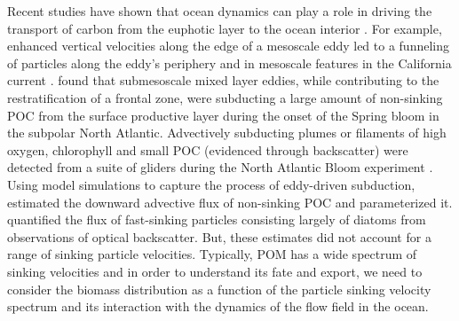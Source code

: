 \documentclass[article,linenumbers]{agujournal2019}
\begin{document}
	Recent studies have shown that ocean dynamics can play a role in driving the transport of carbon from the euphotic layer to the ocean interior \cite{Stukel_2017b,Stukel_2018,Llort_2018}.  For example, enhanced vertical velocities along the edge of a mesoscale eddy led to a funneling of particles along the eddy's periphery \cite{vanHaren_2006, Waite_2016} and in mesoscale features in the California current \cite{Stukel_2017}.  found that submesoscale mixed layer eddies, while contributing to the restratification of a frontal zone, were subducting a large amount of non-sinking POC from the surface productive layer during the onset of the Spring bloom in the subpolar North Atlantic. Advectively subducting plumes or filaments of high oxygen, chlorophyll and small POC (evidenced through backscatter) were detected from a suite of gliders during the North Atlantic Bloom experiment \cite{Alkire_2012}. Using model simulations to capture the process of eddy-driven subduction,  estimated the downward advective flux of non-sinking POC and parameterized it.  quantified the flux of fast-sinking particles consisting largely of diatoms from observations of optical backscatter. But, these estimates did not account for a range of sinking particle velocities. Typically, POM has a wide spectrum of sinking velocities and in order to understand its fate and export, we need to consider the biomass distribution as a function of the particle sinking velocity spectrum and its interaction with the dynamics of the flow field in the ocean.
\end{document}
